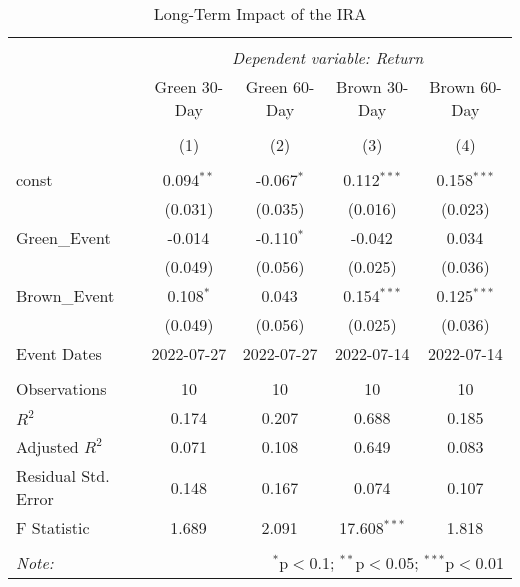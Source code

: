 \begin{table}[!htbp] \centering
  \caption{Long-Term Impact of the IRA}
\begin{tabular}{@{\extracolsep{5pt}}lcccc}
\\[-1.8ex]\hline
\hline \\[-1.8ex]
& \multicolumn{4}{c}{\textit{Dependent variable: Return}} \
\cr \cline{2-5}
\\[-1.8ex] & \multicolumn{1}{c}{Green 30-Day} & \multicolumn{1}{c}{Green 60-Day} & \multicolumn{1}{c}{Brown 30-Day} & \multicolumn{1}{c}{Brown 60-Day}  \\
\\[-1.8ex] & (1) & (2) & (3) & (4) \\
\hline \\[-1.8ex]
 const & 0.094$^{**}$ & -0.067$^{*}$ & 0.112$^{***}$ & 0.158$^{***}$ \\
& (0.031) & (0.035) & (0.016) & (0.023) \\
 Green_Event & -0.014$^{}$ & -0.110$^{*}$ & -0.042$^{}$ & 0.034$^{}$ \\
& (0.049) & (0.056) & (0.025) & (0.036) \\
 Brown_Event & 0.108$^{*}$ & 0.043$^{}$ & 0.154$^{***}$ & 0.125$^{***}$ \\
& (0.049) & (0.056) & (0.025) & (0.036) \\
 Event Dates & 2022-07-27 & 2022-07-27 & 2022-07-14 & 2022-07-14 \\
\hline \\[-1.8ex]
 Observations & 10 & 10 & 10 & 10 \\
 $R^2$ & 0.174 & 0.207 & 0.688 & 0.185 \\
 Adjusted $R^2$ & 0.071 & 0.108 & 0.649 & 0.083 \\
 Residual Std. Error & 0.148 & 0.167 & 0.074 & 0.107 \\
 F Statistic & 1.689$^{}$ & 2.091$^{}$ & 17.608$^{***}$ & 1.818$^{}$ \\
\hline
\hline \\[-1.8ex]
\textit{Note:} & \multicolumn{4}{r}{$^{*}$p$<$0.1; $^{**}$p$<$0.05; $^{***}$p$<$0.01} \\
\end{tabular}
\end{table}